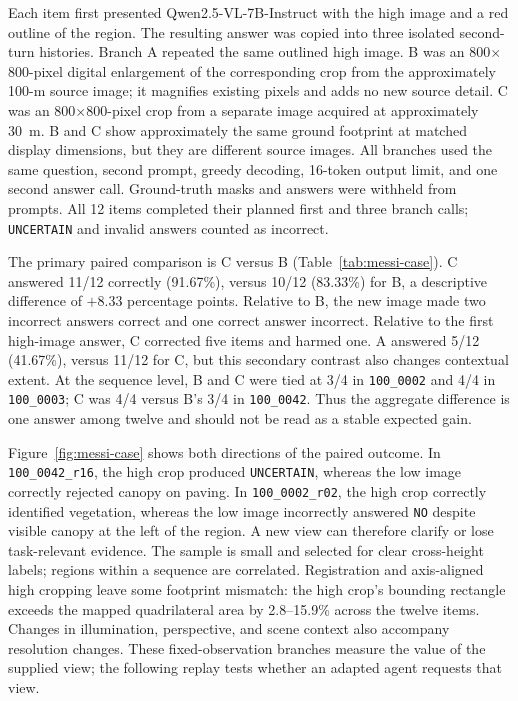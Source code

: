 Each item first presented Qwen2.5-VL-7B-Instruct with the high image and a red outline of the region. The resulting answer was copied into three isolated second-turn histories. Branch A repeated the same outlined high image. B was an 800$\times$800-pixel digital enlargement of the corresponding crop from the approximately 100-m source image; it magnifies existing pixels and adds no new source detail. C was an 800$\times$800-pixel crop from a separate image acquired at approximately 30~m. B and C show approximately the same ground footprint at matched display dimensions, but they are different source images. All branches used the same question, second prompt, greedy decoding, 16-token output limit, and one second answer call. Ground-truth masks and answers were withheld from prompts. All 12 items completed their planned first and three branch calls; \texttt{UNCERTAIN} and invalid answers counted as incorrect.

The primary paired comparison is C versus B (Table~\ref{tab:messi-case}). C answered 11/12 correctly (91.67\%), versus 10/12 (83.33\%) for B, a descriptive difference of $+8.33$ percentage points. Relative to B, the new image made two incorrect answers correct and one correct answer incorrect. Relative to the first high-image answer, C corrected five items and harmed one. A answered 5/12 (41.67\%), versus 11/12 for C, but this secondary contrast also changes contextual extent. At the sequence level, B and C were tied at 3/4 in \texttt{100\_0002} and 4/4 in \texttt{100\_0003}; C was 4/4 versus B's 3/4 in \texttt{100\_0042}. Thus the aggregate difference is one answer among twelve and should not be read as a stable expected gain.

Figure~\ref{fig:messi-case} shows both directions of the paired outcome. In \texttt{100\_0042\_r16}, the high crop produced \texttt{UNCERTAIN}, whereas the low image correctly rejected canopy on paving. In \texttt{100\_0002\_r02}, the high crop correctly identified vegetation, whereas the low image incorrectly answered \texttt{NO} despite visible canopy at the left of the region. A new view can therefore clarify or lose task-relevant evidence. The sample is small and selected for clear cross-height labels; regions within a sequence are correlated. Registration and axis-aligned high cropping leave some footprint mismatch: the high crop's bounding rectangle exceeds the mapped quadrilateral area by 2.8--15.9\% across the twelve items. Changes in illumination, perspective, and scene context also accompany resolution changes. These fixed-observation branches measure the value of the supplied view; the following replay tests whether an adapted agent requests that view.

